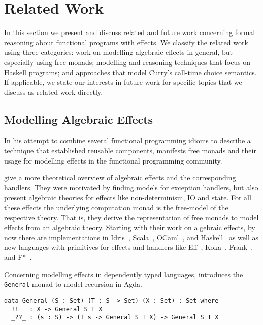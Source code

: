 \section{Related Work}

In this section we present and discuss related and future work concerning formal reasoning about functional programs with effects.
We classify the related work using three categories: work on modelling algebraic effects in general, but especially using free monads; modelling and reasoning techniques that focus on Haskell programs; and approaches that model Curry's call\--time choice semantics.
If applicable, we state our interests in future work for specific topics that we discuss as related work directly.

\subsection{Modelling Algebraic Effects}

In his attempt to combine several functional programming idioms to describe a technique that established reusable components, \citet{swierstra2008data} manifests free monads and their usage for modelling effects in the functional programming community.

\citet{plotkin2009handlers} give a more theoretical overview of algebraic effects and the corresponding handlers.
They were motivated by finding models for exception handlers, but also present algebraic theories for effects like non\--determinism, IO and state.
For all these effects the underlying computation monad is the free\--model of the respective theory.
That is, they derive the representation of free monads to model effects from an algebraic theory.
Starting with their work on algebraic effects, by now there are implementations in Idris~\citep{brady2013programming}, Scala~\citep{brachthauser2017effekt}, OCaml~\citep{kiselyov2018eff}, and Haskell~\citep{kiselyov2015freer,kammar2013handlers} as well as new languages with primitives for effects and handlers like Eff~\citep{pretnar2015introduction}, Koka~\citep{leijen2016algebraic}, Frank~\citep{lindley2017be}, and F*~\citep{swamy2016dependent}.

Concerning modelling effects in dependently typed languages, \citet{mcbride2015turingcompleteness} introduces the \texttt{General} monad to model recursion in Agda.

\begin{verbatim}
data General (S : Set) (T : S -> Set) (X : Set) : Set where
  !!   : X -> General S T X
  _??_ : (s : S) -> (T s -> General S T X) -> General S T X
\end{verbatim}

